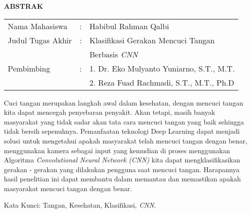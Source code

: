 \begin{center}
  \large\textbf{ABSTRAK}
\end{center}


\vspace{2ex}

\begingroup
  \setlength{\tabcolsep}{0pt}

  \noindent
  \begin{tabularx}{\textwidth}{l >{\centering}m{2em} X}
    Nama Mahasiswa    &:& 	Habibul Rahman Qalbi\\

    Judul Tugas Akhir &:&	Klasifikasi Gerakan Mencuci Tangan  \\
    				  & &	Berbasis \emph{CNN} \\

    Pembimbing        &:& 1. Dr. Eko Mulyanto Yuniarno, S.T., M.T. \\
                      & & 2. Reza Fuad Rachmadi, S.T., M.T., Ph.D \\
  \end{tabularx}
\endgroup

Cuci tangan merupakan langkah awal dalam kesehatan, dengan mencuci tangan kita dapat mencegah penyebaran penyakit. Akan tetapi, masih banyak masyarakat yang tidak sadar akan tata cara mencuci tangan yang baik sehingga tidak bersih sepenuhnya. Pemanfaatan teknologi Deep Learning dapat menjadi solusi untuk mengetahui apakah masyarakat telah mencuci tangan dengan benar, menggunakan kamera sebagai input yang kemudian di proses menggunakan Algoritma \emph{Convolutional Neural Network (CNN)} kita dapat mengklasifikasikan gerakan - gerakan yang dilakukan pengguna saat mencuci tangan. Harapannya hasil penelitian ini dapat membantu dalam memantau dan memastikan apakah masyarakat mencuci tangan dengan benar.

Kata Kunci: Tangan, Kesehatan, Klasifikasi, \emph{CNN}.
